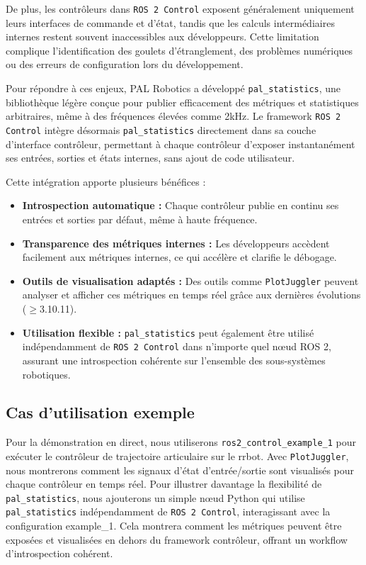 \documentclass[11pt,a4paper]{article}
\begin{document}
De plus, les contrôleurs dans \texttt{ROS 2 Control} exposent généralement
uniquement leurs interfaces de commande et d'état, tandis que les calculs
intermédiaires internes restent souvent inaccessibles aux développeurs. Cette
limitation complique l'identification des goulets d'étranglement, des problèmes
numériques ou des erreurs de configuration lors du développement.

Pour répondre à ces enjeux, PAL Robotics a développé \texttt{pal\_statistics},
une bibliothèque légère conçue pour publier efficacement des métriques et
statistiques arbitraires, même à des fréquences élevées comme 2kHz. Le framework
\texttt{ROS 2 Control} intègre désormais \texttt{pal\_statistics} directement
dans sa couche d'interface contrôleur, permettant à chaque contrôleur d'exposer
instantanément ses entrées, sorties et états internes, sans ajout de code
utilisateur.

Cette intégration apporte plusieurs bénéfices :
\begin{itemize}
  \item \textbf{Introspection automatique :} Chaque contrôleur publie en continu
        ses entrées et sorties par défaut, même à haute fréquence.
  \item \textbf{Transparence des métriques internes :} Les développeurs accèdent
        facilement aux métriques internes, ce qui accélère et clarifie le
        débogage.
  \item \textbf{Outils de visualisation adaptés :} Des outils comme
        \texttt{PlotJuggler} peuvent analyser et afficher ces métriques en temps
        réel grâce aux dernières évolutions ($\geq$3.10.11).
  \item \textbf{Utilisation flexible :} \texttt{pal\_statistics} peut également
        être utilisé indépendamment de \texttt{ROS 2 Control} dans n'importe
        quel n\oe{}ud ROS 2, assurant une introspection cohérente sur l'ensemble des
        sous-systèmes robotiques.
\end{itemize}

\subsection*{Cas d'utilisation exemple}

Pour la démonstration en direct, nous utiliserons
\texttt{ros2\_control\_example\_1} pour exécuter le contrôleur de trajectoire
articulaire sur le rrbot. Avec \texttt{PlotJuggler}, nous montrerons comment les
signaux d'état d'entrée/sortie sont visualisés pour chaque contrôleur en temps
réel. Pour illustrer davantage la flexibilité de \texttt{pal\_statistics}, nous
ajouterons un simple nœud Python qui utilise \texttt{pal\_statistics}
indépendamment de \texttt{ROS 2 Control}, interagissant avec la configuration
example\_1. Cela montrera comment les métriques peuvent être exposées et
visualisées en dehors du framework contrôleur, offrant un workflow
d'introspection cohérent.
\end{document}
